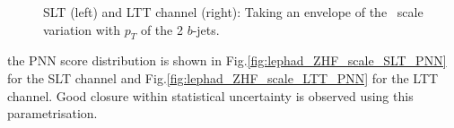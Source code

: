 \begin{figure}[!h]
\centering
{}\quad
{}\quad
\caption{SLT (left) and LTT channel (right): Taking an envelope of the \ZHF\ scale variation with $p_T$ of the 2 $b$-jets.}
\label{fig:lephad_ZHF_scale_pTBB}
\end{figure}
    
the PNN score distribution is shown in Fig.\ref{fig:lephad_ZHF_scale_SLT_PNN} 
for the SLT channel and Fig.\ref{fig:lephad_ZHF_scale_LTT_PNN} for the LTT channel.
Good closure within statistical uncertainty is observed using this parametrisation.


